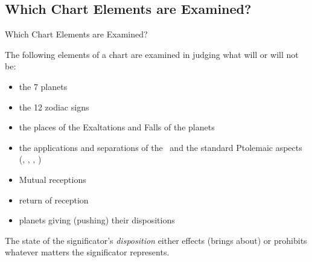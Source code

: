 \subsection{Which Chart Elements are Examined?}
\begin{frame}[t]{Which Chart Elements are Examined?}

The following elements of a chart are examined in judging what will or will not be:
\begin{itemize}
\item the 7 planets
\item the 12 zodiac signs
\item the places of  the Exaltations and Falls of the planets
\item the applications and separations of the \Conjunction\ and the standard Ptolemaic aspects (\Sextile, \Square, \Trine, \Opposition)
\item Mutual receptions
\item return of reception
\item planets giving (pushing) their dispositions
\end{itemize}
\vspace{0.5cm}

The state of the significator's \textsl{disposition} either effects (brings about) or prohibits whatever matters the significator represents.
\end{frame}
